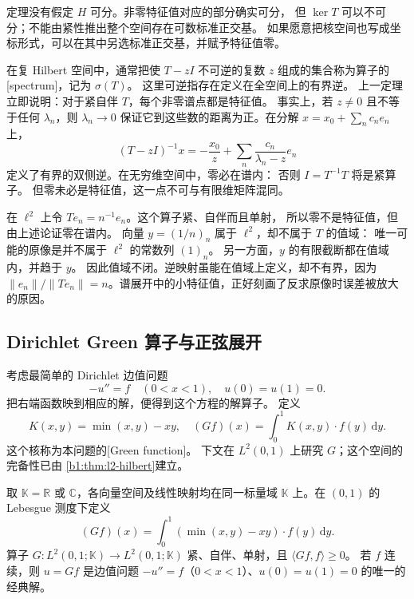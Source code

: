 定理没有假定 \(H\) 可分。非零特征值对应的部分确实可分，
但 \(\ker T\) 可以不可分；不能由紧性推出整个空间存在可数标准正交基。
如果愿意把核空间也写成坐标形式，可以在其中另选标准正交基，并赋予特征值零。

\ProseParagraphBreak

在复 Hilbert 空间中，通常把使 \(T-zI\) 不可逆的复数 \(z\) 组成的集合称为算子的%
[spectrum]，记为 \(\sigma(T)\)。
这里可逆指存在定义在全空间上的有界逆。
上一定理立即说明：对于紧自伴 \(T\)，每个非零谱点都是特征值。
事实上，若 \(z\ne0\) 且不等于任何 \(\lambda_n\)，则 \(\lambda_n\to0\)
保证它到这些数的距离为正。在分解 \(x=x_0+\sum_n c_ne_n\) 上，
\[
 (T-zI)^{-1}x=-\frac{x_0}{z}+\sum_n\frac{c_n}{\lambda_n-z}e_n
\]
定义了有界的双侧逆。在无穷维空间中，零必在谱内：
否则 \(I=T^{-1}T\) 将是紧算子。
但零未必是特征值，这一点不可与有限维矩阵混同。

\ProseParagraphBreak

在 \(\ell^2\) 上令 \(Te_n=n^{-1}e_n\)。这个算子紧、自伴而且单射，
所以零不是特征值，但由上述论证零在谱内。
向量 \(y=(1/n)_n\) 属于 \(\ell^2\)，却不属于 \(T\) 的值域：
唯一可能的原像是并不属于 \(\ell^2\) 的常数列 \((1)_n\)。
另一方面，\(y\) 的有限截断都在值域内，并趋于 \(y\)。
因此值域不闭。逆映射虽能在值域上定义，却不有界，因为%
\(\|e_n\|/\|Te_n\|=n\)。谱展开中的小特征值，正好刻画了反求原像时误差被放大的原因。

\subsection{Dirichlet Green 算子与正弦展开}
\label{b1:subsec:080504}

考虑最简单的 Dirichlet 边值问题
\[
 -u''=f\quad(0<x<1),\quad u(0)=u(1)=0.
\]
把右端函数映到相应的解，便得到这个方程的解算子。
定义
\[
 K(x,y)=\min(x,y)-xy,\quad
 (Gf)(x)=\int_0^1K(x,y)\cdot f(y)\,\mathrm{d}y.
\]
这个核称为本问题的[Green function]。
下文在 \(L^2(0,1)\) 上研究 \(G\)；这个空间的完备性已由%
\cref{b1:thm:l2-hilbert}建立。

\begin{proposition}
\label{b1:prop:dirichlet-green}
取 \(\mathbb K=\mathbb R\) 或 \(\mathbb C\)，各向量空间及线性映射均在同一标量域 \(\mathbb K\) 上。在 \((0,1)\) 的 Lebesgue 测度下定义
\[
 (Gf)(x)=\int_0^1(\min(x,y)-xy)\cdot f(y)\,\mathrm dy.
\]
算子 \(G:L^2(0,1;\mathbb K)\to L^2(0,1;\mathbb K)\) 紧、自伴、单射，且%
\(\langle Gf,f\rangle\geq0\)。
若 \(f\) 连续，则 \(u=Gf\) 是边值问题 \(-u''=f\)（\(0<x<1\)）、\(u(0)=u(1)=0\) 的唯一的经典解。
\end{proposition}

